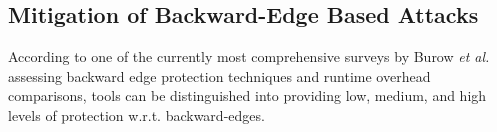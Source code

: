 % 

\subsection{Mitigation of Backward-Edge Based Attacks}
\label{Mitigation of Return Edge Attacks}
According to one of the currently most comprehensive surveys by Burow \textit{et al.}~\cite{cfi:survey} assessing backward edge protection techniques and runtime overhead comparisons, tools can be distinguished into providing
 low, medium, and high levels of protection w.r.t. backward-edges. %

